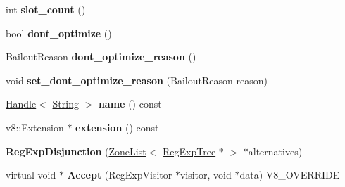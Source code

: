 \begin{DoxyCompactItemize}
\item 
\hypertarget{classv8_1_1internal_1_1_v8___f_i_n_a_l_a30c876a573aab4ed0e692a58f101e5a7}{}int {\bfseries slot\+\_\+count} ()\label{classv8_1_1internal_1_1_v8___f_i_n_a_l_a30c876a573aab4ed0e692a58f101e5a7}

\item 
\hypertarget{classv8_1_1internal_1_1_v8___f_i_n_a_l_a7b7816172ec2456fa14a0c833e06639a}{}bool {\bfseries dont\+\_\+optimize} ()\label{classv8_1_1internal_1_1_v8___f_i_n_a_l_a7b7816172ec2456fa14a0c833e06639a}

\item 
\hypertarget{classv8_1_1internal_1_1_v8___f_i_n_a_l_a1c477843ae79e95ca206aa427cf0f8d4}{}Bailout\+Reason {\bfseries dont\+\_\+optimize\+\_\+reason} ()\label{classv8_1_1internal_1_1_v8___f_i_n_a_l_a1c477843ae79e95ca206aa427cf0f8d4}

\item 
\hypertarget{classv8_1_1internal_1_1_v8___f_i_n_a_l_a16b606189382497bad452f38c52856d4}{}void {\bfseries set\+\_\+dont\+\_\+optimize\+\_\+reason} (Bailout\+Reason reason)\label{classv8_1_1internal_1_1_v8___f_i_n_a_l_a16b606189382497bad452f38c52856d4}

\item 
\hypertarget{classv8_1_1internal_1_1_v8___f_i_n_a_l_ae093884f144601c733c3c49b3af199b4}{}\hyperlink{classv8_1_1internal_1_1_handle}{Handle}$<$ \hyperlink{classv8_1_1internal_1_1_string}{String} $>$ {\bfseries name} () const \label{classv8_1_1internal_1_1_v8___f_i_n_a_l_ae093884f144601c733c3c49b3af199b4}

\item 
\hypertarget{classv8_1_1internal_1_1_v8___f_i_n_a_l_a20852a342fdb4595b00ff74dfe66761c}{}v8\+::\+Extension $\ast$ {\bfseries extension} () const \label{classv8_1_1internal_1_1_v8___f_i_n_a_l_a20852a342fdb4595b00ff74dfe66761c}

\item 
\hypertarget{classv8_1_1internal_1_1_v8___f_i_n_a_l_a51b3180d37d8b310eb56f5b7245a7adb}{}{\bfseries Reg\+Exp\+Disjunction} (\hyperlink{classv8_1_1internal_1_1_zone_list}{Zone\+List}$<$ \hyperlink{classv8_1_1internal_1_1_reg_exp_tree}{Reg\+Exp\+Tree} $\ast$ $>$ $\ast$alternatives)\label{classv8_1_1internal_1_1_v8___f_i_n_a_l_a51b3180d37d8b310eb56f5b7245a7adb}

\item 
\hypertarget{classv8_1_1internal_1_1_v8___f_i_n_a_l_a5a421cb811caf33f244ce08fe3e5ac14}{}virtual void $\ast$ {\bfseries Accept} (Reg\+Exp\+Visitor $\ast$visitor, void $\ast$data) V8\+\_\+\+O\+V\+E\+R\+R\+I\+D\+E\label{classv8_1_1internal_1_1_v8___f_i_n_a_l_a5a421cb811caf33f244ce08fe3e5ac14}


\end{DoxyCompactItemize}
